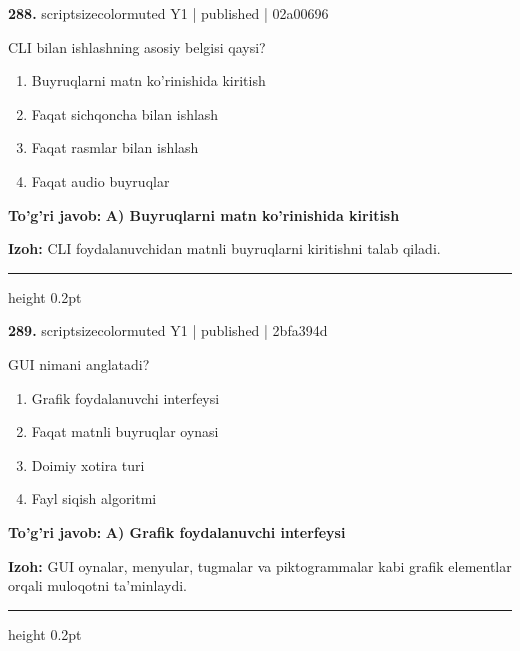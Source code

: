 \documentclass[10pt,a4paper]{article}
\begin{document}
{\bfseries\sffamily\color{ink} 288.} {scriptsizecolor{muted} Y1 | published | 02a00696}
\par
CLI bilan ishlashning asosiy belgisi qaysi?
\begin{enumerate}[label=\Alph*),leftmargin=9mm]
\item Buyruqlarni matn ko'rinishida kiritish
\item Faqat sichqoncha bilan ishlash
\item Faqat rasmlar bilan ishlash
\item Faqat audio buyruqlar
\end{enumerate}
\begin{tcolorbox}[enhanced,breakable,colback=teal!4,colframe=teal!60!black,boxrule=0.45pt,arc=1.2mm,left=2.7mm,right=2.7mm,top=1.8mm,bottom=1.8mm,before skip=2mm,after skip=2mm]
{\bfseries\sffamily\color{teal}To'g'ri javob:} \textbf{A) Buyruqlarni matn ko'rinishida kiritish}
\par\smallskip
{\bfseries Izoh:} CLI foydalanuvchidan matnli buyruqlarni kiritishni talab qiladi.
\end{tcolorbox}
\vspace{2mm}\hrule height 0.2pt\vspace{3mm}

{\bfseries\sffamily\color{ink} 289.} {scriptsizecolor{muted} Y1 | published | 2bfa394d}
\par
GUI nimani anglatadi?
\begin{enumerate}[label=\Alph*),leftmargin=9mm]
\item Grafik foydalanuvchi interfeysi
\item Faqat matnli buyruqlar oynasi
\item Doimiy xotira turi
\item Fayl siqish algoritmi
\end{enumerate}
\begin{tcolorbox}[enhanced,breakable,colback=teal!4,colframe=teal!60!black,boxrule=0.45pt,arc=1.2mm,left=2.7mm,right=2.7mm,top=1.8mm,bottom=1.8mm,before skip=2mm,after skip=2mm]
{\bfseries\sffamily\color{teal}To'g'ri javob:} \textbf{A) Grafik foydalanuvchi interfeysi}
\par\smallskip
{\bfseries Izoh:} GUI oynalar, menyular, tugmalar va piktogrammalar kabi grafik elementlar orqali muloqotni ta'minlaydi.
\end{tcolorbox}
\vspace{2mm}\hrule height 0.2pt\vspace{3mm}
\end{document}
